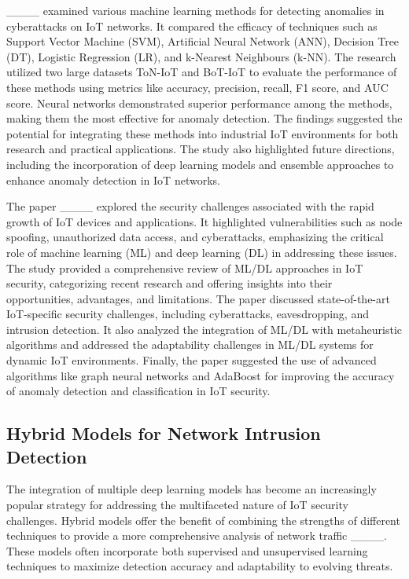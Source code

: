 ____ examined various machine learning methods for detecting anomalies in cyberattacks on IoT networks. It compared the efficacy of techniques such as Support Vector Machine (SVM), Artificial Neural Network (ANN), Decision Tree (DT), Logistic Regression (LR), and k-Nearest Neighbours (k-NN). The research utilized two large datasets ToN-IoT and BoT-IoT to evaluate the performance of these methods using metrics like accuracy, precision, recall, F1 score, and AUC score. Neural networks demonstrated superior performance among the methods, making them the most effective for anomaly detection. The findings suggested the potential for integrating these methods into industrial IoT environments for both research and practical applications. The study also highlighted future directions, including the incorporation of deep learning models and ensemble approaches to enhance anomaly detection in IoT networks.

The paper ____ explored the security challenges associated with the rapid growth of IoT devices and applications. It highlighted vulnerabilities such as node spoofing, unauthorized data access, and cyberattacks, emphasizing the critical role of machine learning (ML) and deep learning (DL) in addressing these issues. The study provided a comprehensive review of ML/DL approaches in IoT security, categorizing recent research and offering insights into their opportunities, advantages, and limitations. The paper discussed state-of-the-art IoT-specific security challenges, including cyberattacks, eavesdropping, and intrusion detection. It also analyzed the integration of ML/DL with metaheuristic algorithms and addressed the adaptability challenges in ML/DL systems for dynamic IoT environments. Finally, the paper suggested the use of advanced algorithms like graph neural networks and AdaBoost for improving the accuracy of anomaly detection and classification in IoT security.
\subsection{Hybrid Models for Network Intrusion Detection}

The integration of multiple deep learning models has become an increasingly popular strategy for addressing the multifaceted nature of IoT security challenges. Hybrid models offer the benefit of combining the strengths of different techniques to provide a more comprehensive analysis of network traffic ____. These models often incorporate both supervised and unsupervised learning techniques to maximize detection accuracy and adaptability to evolving threats.


